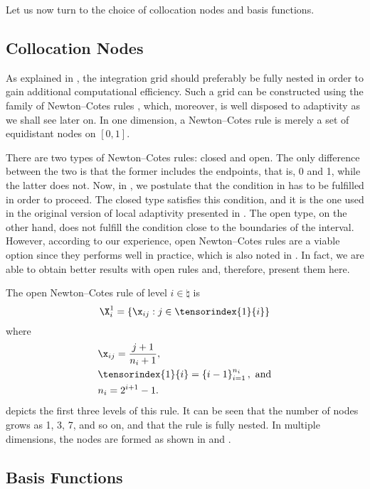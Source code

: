 Let us now turn to the choice of collocation nodes and basis functions.

\subsection{Collocation Nodes}

As explained in , the integration grid should
preferably be fully nested in order to gain additional computational efficiency.
Such a grid can be constructed using the family of Newton--Cotes rules
\cite{ma2009}, which, moreover, is well disposed to adaptivity as we shall see
later on. In one dimension, a Newton--Cotes rule is merely a set of equidistant
nodes on $[0, 1]$.

There are two types of Newton--Cotes rules: closed and open. The only difference
between the two is that the former includes the endpoints, that is, 0 and 1,
while the latter does not. Now, in , we postulate
that the condition in  has to be fulfilled in
order to proceed. The closed type satisfies this condition, and it is the one
used in the original version of local adaptivity presented in \cite{ma2009}. The
open type, on the other hand, does not fulfill the condition close to the
boundaries of the interval. However, according to our experience, open
Newton--Cotes rules are a viable option since they performs well in practice,
which is also noted in \cite{klimke2006}. In fact, we are able to obtain better
results with open rules and, therefore, present them here.

The open Newton--Cotes rule of level $i \in \natural$ is
\[
  \X^1_i = \left\{ \x_{ij}: j \in \tensorindex{1}{i} \right\}
\]
where
\begin{align*}
  & \x_{ij} = \frac{j + 1}{n_i + 1}, \\
  & \tensorindex{1}{i} = \left\{ i - 1 \right\}_{i = 1}^{n_i}, \text{ and} \\
  & n_i = 2^{i + 1} - 1.
\end{align*}
 depicts the first three levels of this rule. It can be seen
that the number of nodes grows as 1, 3, 7, and so on, and that the rule is fully
nested. In multiple dimensions, the nodes are formed as shown in
 and .

\subsection{Basis Functions}

